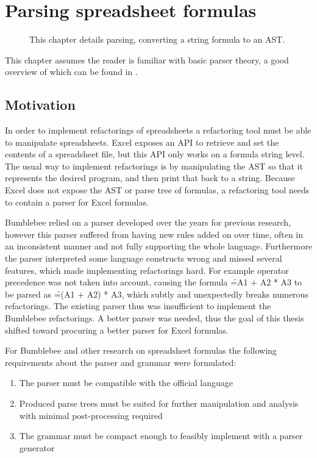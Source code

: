 \chapter{Parsing spreadsheet formulas}
\label{chapter:parsing}

\noindent
\begin{figure}[h]
\centerfloat

\caption{This chapter details parsing, converting a string formula to an AST.}
\end{figure}


\noindent
This chapter assumes the reader is familiar with basic parser theory, a good overview of which can be found in \cite{dragonbook}.

\section{Motivation}

In order to implement refactorings of spreadsheets a refactoring tool must be able to manipulate spreadsheets.
Excel exposes an API to retrieve and set the contents of a spreadsheet file, but this API only works on a formula string level.
The usual way to implement refactorings is by manipulating the AST so that it represents the desired program, and then print that back to a string.
Because Excel does not expose the AST or parse tree of formulas, a refactoring tool needs to contain a parser for Excel formulas.

Bumblebee relied on a parser developed over the years for previous research, however this parser suffered from having new rules added on over time, often in an inconsistent manner and not fully supporting the whole language.
Furthermore the parser interpreted some language constructs wrong and missed several features, which made implementing refactorings hard.
For example operator precedence was not taken into account, causing the formula \f{=A1 + A2 * A3} to be parsed as \f{=(A1 + A2) * A3}, which subtly and unexpectedly breaks numerous refactorings.
The existing parser thus was insufficient to implement the Bumblebee refactorings.
A better parser was needed, thus the goal of this thesis shifted toward procuring a better parser for Excel formulas.

For Bumblebee and other research on spreadsheet formulas the following requirements about the parser and grammar were formulated:

\begin{enumerate}
\label{sec:designgoals}
\item The parser must be compatible with the official language
\item Produced parse trees must be suited for further manipulation and analysis with minimal post-processing required
\item The grammar must be compact enough to feasibly implement with a parser generator
\end{enumerate}

